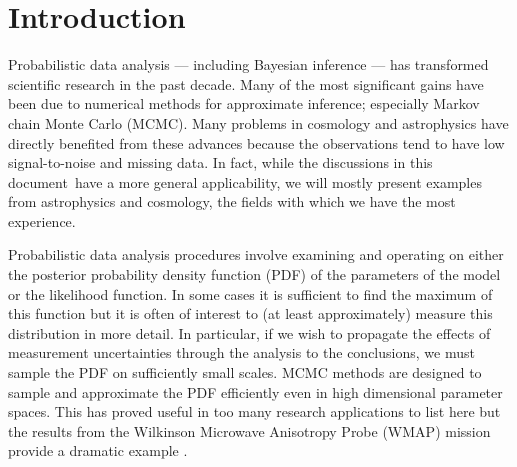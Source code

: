 \documentclass[12pt,preprint]{aastex}
\newcommand{\paper}{document}
\begin{document}
\section{Introduction}

Probabilistic data analysis --- including Bayesian inference --- has
transformed scientific research in the past decade. Many of the most
significant gains have been due to numerical methods for approximate
inference; especially Markov chain Monte Carlo (MCMC). Many
problems in cosmology and astrophysics have directly benefited from these
advances because the observations tend to have low signal-to-noise and
missing data. In fact, while the discussions in this \paper\ have a more
general applicability, we will mostly present examples from astrophysics
and cosmology, the fields with which we have the most experience.

Probabilistic data analysis procedures involve examining and operating on
either the posterior probability density function (PDF) of the parameters
of the model or the likelihood function. In some cases it is
sufficient to find the maximum of this function but it is often of
interest to (at least approximately) measure this distribution in more detail.
In particular, if we wish to propagate the effects of measurement
uncertainties through the analysis to the conclusions, we must sample the
PDF on sufficiently small scales. MCMC methods are designed to
sample and approximate the PDF efficiently even in high dimensional
parameter spaces. This has proved useful in too many research
applications to list here but the results from the Wilkinson Microwave
Anisotropy Probe (WMAP) mission provide a dramatic example
\citep[for example,][]{Dunkley:2005}.
\end{document}
